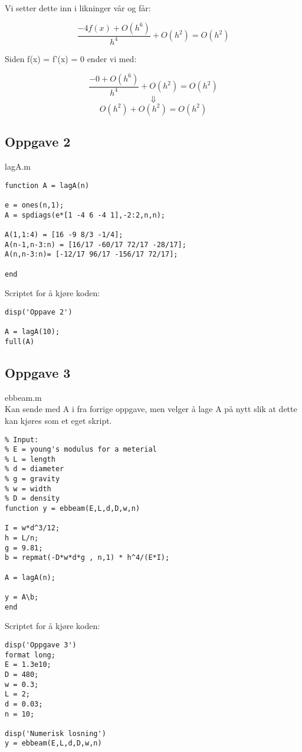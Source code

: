 Vi setter dette inn i likninger vår og får:

\begin{equation*}
\frac{-4f(x) + O(h^6)}{h^4} + O(h^2) = O(h^2)
\end{equation*}

Siden f(x) = f'(x) = 0 ender vi med:


\begin{equation*}
\frac{-0+ O(h^6)}{h^4} + O(h^2) = O(h^2)
\end{equation*}
\begin{equation*}
\Downarrow
\end{equation*}
\begin{equation*}
O(h^2) + O(h^2) = O(h^2)
\end{equation*}

\subsection{Oppgave 2}

lagA.m
\begin{lstlisting}
function A = lagA(n)

e = ones(n,1);
A = spdiags(e*[1 -4 6 -4 1],-2:2,n,n);

A(1,1:4) = [16 -9 8/3 -1/4];
A(n-1,n-3:n) = [16/17 -60/17 72/17 -28/17];
A(n,n-3:n)= [-12/17 96/17 -156/17 72/17];

end
\end{lstlisting}

Scriptet for å kjøre koden:
\begin{lstlisting}
disp('Oppave 2')

A = lagA(10);
full(A)
\end{lstlisting}

\subsection{Oppgave 3}

ebbeam.m
\\
Kan sende med A i fra forrige oppgave, men velger å lage A på nytt slik at dette kan kjøres som et eget skript.
\begin{lstlisting}
% Input:
% E = young's modulus for a meterial
% L = length
% d = diameter
% g = gravity
% w = width
% D = density
function y = ebbeam(E,L,d,D,w,n)

I = w*d^3/12;
h = L/n;
g = 9.81;
b = repmat(-D*w*d*g , n,1) * h^4/(E*I);

A = lagA(n);

y = A\b;
end
\end{lstlisting}
Scriptet for å kjøre koden:
\begin{lstlisting}
disp('Oppgave 3')
format long;
E = 1.3e10;
D = 480;
w = 0.3;
L = 2;
d = 0.03;
n = 10;

disp('Numerisk losning')
y = ebbeam(E,L,d,D,w,n)
\end{lstlisting}

